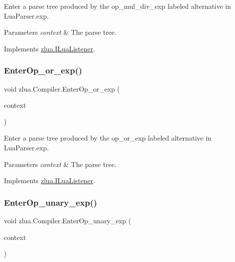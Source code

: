Enter a parse tree produced by the {\ttfamily op\+\_\+mul\+\_\+div\+\_\+exp} labeled alternative in Lua\+Parser.\+exp. 


\begin{DoxyParams}{Parameters}
{\em context} & The parse tree.\\
\hline
\end{DoxyParams}


Implements \mbox{\hyperlink{interfacezlua_1_1_i_lua_listener_adceb73b6f7d7f84737f72b1a5c5fe4d6}{zlua.\+I\+Lua\+Listener}}.

\mbox{\label{classzlua_1_1_compiler_a00586a6ef587aa5305c9ab8071c15d5a}} 
\subsubsection{\texorpdfstring{Enter\+Op\+\_\+or\+\_\+exp()}{EnterOp\_or\_exp()}}
{\footnotesize\ttfamily void zlua.\+Compiler.\+Enter\+Op\+\_\+or\+\_\+exp (\begin{DoxyParamCaption}\item[{\mbox{[}\+Not\+Null\mbox{]} \mbox{\hyperlink{classzlua_1_1_lua_parser_1_1_op__or__exp_context}{Lua\+Parser.\+Op\+\_\+or\+\_\+exp\+Context}}}]{context }\end{DoxyParamCaption})}



Enter a parse tree produced by the {\ttfamily op\+\_\+or\+\_\+exp} labeled alternative in Lua\+Parser.\+exp. 


\begin{DoxyParams}{Parameters}
{\em context} & The parse tree.\\
\hline
\end{DoxyParams}


Implements \mbox{\hyperlink{interfacezlua_1_1_i_lua_listener_a51c92b24a1ae3217599c08d098f351e8}{zlua.\+I\+Lua\+Listener}}.

\mbox{\label{classzlua_1_1_compiler_a6eb871aad9a35e90e75434308d7edac0}} 
\subsubsection{\texorpdfstring{Enter\+Op\+\_\+unary\+\_\+exp()}{EnterOp\_unary\_exp()}}
{\footnotesize\ttfamily void zlua.\+Compiler.\+Enter\+Op\+\_\+unary\+\_\+exp (\begin{DoxyParamCaption}\item[{\mbox{[}\+Not\+Null\mbox{]} \mbox{\hyperlink{classzlua_1_1_lua_parser_1_1_op__unary__exp_context}{Lua\+Parser.\+Op\+\_\+unary\+\_\+exp\+Context}}}]{context }\end{DoxyParamCaption})}



